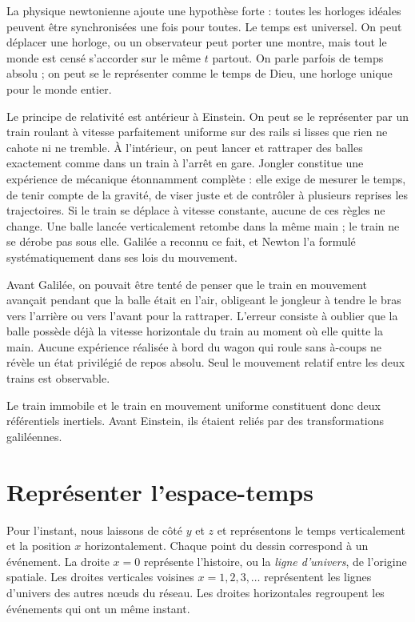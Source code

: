 La physique newtonienne ajoute une hypothèse forte : toutes les horloges idéales peuvent être synchronisées une fois pour toutes. Le temps est universel. On peut déplacer une horloge, ou un observateur peut porter une montre, mais tout le monde est censé s’accorder sur le même \(t\) partout. On parle parfois de temps absolu ; on peut se le représenter comme le temps de Dieu, une horloge unique pour le monde entier.

Le principe de relativité est antérieur à Einstein. On peut se le représenter par un train roulant à vitesse parfaitement uniforme sur des rails si lisses que rien ne cahote ni ne tremble. À l’intérieur, on peut lancer et rattraper des balles exactement comme dans un train à l’arrêt en gare. Jongler constitue une expérience de mécanique étonnamment complète : elle exige de mesurer le temps, de tenir compte de la gravité, de viser juste et de contrôler à plusieurs reprises les trajectoires. Si le train se déplace à vitesse constante, aucune de ces règles ne change. Une balle lancée verticalement retombe dans la même main ; le train ne se dérobe pas sous elle. Galilée a reconnu ce fait, et Newton l’a formulé systématiquement dans ses lois du mouvement.

Avant Galilée, on pouvait être tenté de penser que le train en mouvement avançait pendant que la balle était en l’air, obligeant le jongleur à tendre le bras vers l’arrière ou vers l’avant pour la rattraper. L’erreur consiste à oublier que la balle possède déjà la vitesse horizontale du train au moment où elle quitte la main. Aucune expérience réalisée à bord du wagon qui roule sans à-coups ne révèle un état privilégié de repos absolu. Seul le mouvement relatif entre les deux trains est observable.

Le train immobile et le train en mouvement uniforme constituent donc deux référentiels inertiels. Avant Einstein, ils étaient reliés par des transformations galiléennes.

\section{Représenter l’espace-temps}

Pour l’instant, nous laissons de côté \(y\) et \(z\) et représentons le temps verticalement et la position \(x\) horizontalement. Chaque point du dessin correspond à un événement. La droite \(x=0\) représente l’histoire, ou la \emph{ligne d’univers}, de l’origine spatiale. Les droites verticales voisines \(x=1,2,3,\ldots\) représentent les lignes d’univers des autres nœuds du réseau. Les droites horizontales regroupent les événements qui ont un même instant.

